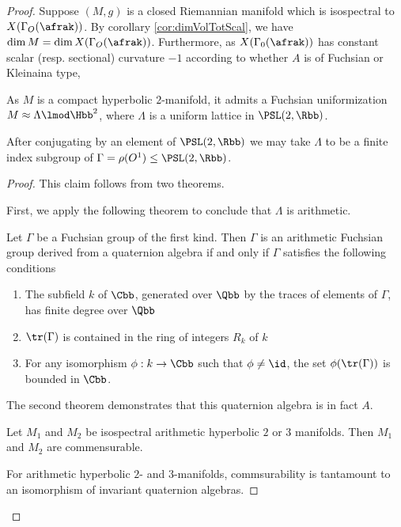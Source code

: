 \begin{proof}
  Suppose $(M,g)$ is a closed Riemannian manifold which is isospectral to $X(\Gamma_O(\afrak))$. By corollary \ref{cor:dimVolTotScal}, we have $\dim M = \dim X(\Gamma_O(\afrak))$. Furthermore, as  $X(\Gamma_0(\afrak))$ has constant scalar (resp. sectional) curvature $-1$ according to whether $A$ is of Fuchsian or Kleinaina type, 





  As $M$ is a compact hyperbolic $2$-manifold, it admits a Fuchsian uniformization $M \approx \Lambda \lmod \Hbb^2$, where $\Lambda$ is a uniform lattice in $\PSL(2,\Rbb)$.
  \begin{claim}
    After conjugating by an element of $\PSL(2,\Rbb)$ we may take $\Lambda$ to be a finite index subgroup of $\Gamma = \rho(O^1) \leq  \PSL(2,\Rbb)$.
  \end{claim}
  \begin{proof}
    This claim follows from two theorems.

    First, we apply the following theorem to conclude that $\Lambda$ is arithmetic.
    \begin{thm}\label{thm:takeuchi}
      Let $\Gamma$ be a Fuchsian group of the first kind. Then $\Gamma$ is an arithmetic Fuchsian group derived from a quaternion algebra if and only if $\Gamma$ satisfies the following conditions
      \begin{enumerate}
        \item The subfield $k$ of $\Cbb$, generated over $\Qbb$ by the traces of elements of $\Gamma$, has finite degree over $\Qbb$
        \item $\tr(\Gamma)$ is contained in the ring of integers $R_{k}$ of $k$
        \item For any isomorphism $\phi: k \to \Cbb$ such that $\phi \neq \id$, the set $\phi(\tr(\Gamma))$ is bounded in $\Cbb$.
      \end{enumerate}
    \end{thm}

    The second theorem demonstrates that this quaternion algebra is in fact $A$.
    \begin{thm}

      Let $M_1$ and $M_2$ be isospectral arithmetic hyperbolic $2$ or $3$ manifolds. Then $M_1$ and $M_2$ are commensurable.
    \end{thm}
    For arithmetic hyperbolic $2$- and $3$-manifolds, commsurability is tantamount to an isomorphism of invariant quaternion algebras.


\end{proof}
\end{proof}
